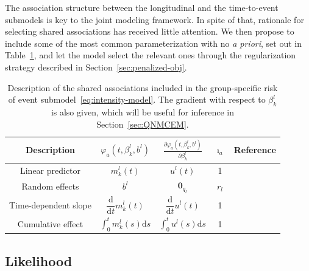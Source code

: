 \documentclass[11pt]{article}
\newcommand{\dd}{\mathrm{d}}
\begin{document}
The association structure between the longitudinal and the time-to-event submodels is key to the joint modeling framework. In spite of that, rationale for selecting shared associations has received little attention. We then propose to include some of the most common parameterization with no \textit{a priori}, set out in Table~\ref{table:shared_associations}, and let the model select the relevant ones through the regularization strategy described in Section~\ref{sec:penalized-obj}.
\begin{table}[htb]
\centering
\begin{tabular}{ccccc}
\toprule
Description & $\varphi_a(t, \beta_k^l, b^l)$ & $\frac{\partial \varphi_a(t, \beta_k^l, b^l)}{\partial \beta_k^l}$ & $\imath_a$ & Reference \\
\midrule
Linear predictor & $m_k^l(t)$ & $u^l(t)$ & 1 & \citet{chi2006joint} \\ [.15cm]
Random effects & $b^l$ & $\mathbf{0}_{q_l}$ & $r_l$ & \citet{hatfield2011joint} \\ 
Time-dependent slope & $\dfrac{\dd}{\dd t} m_k^l(t)$ & $\dfrac{\dd}{\dd t} u^l(t)$ & 1 & \citet{rizopoulos2011bayesian} \\ [.3cm]
Cumulative effect & $\int_0^t m_k^l(s) \dd s$ & $\int_0^t u^l(s) \dd s$ & 1 & \citet{andrinopoulou2017combined} \\ [.1cm]
 \bottomrule
\end{tabular}
\caption[]{Description of the shared associations included in the group-specific risk of event submodel~\eqref{eq:intensity-model}. The gradient with respect to $\beta_k^l$ is also given, which will be useful for inference in Section~\ref{sec:QNMCEM}.}
\label{table:shared_associations}
\end{table}
 
\subsection{Likelihood}
\end{document}

